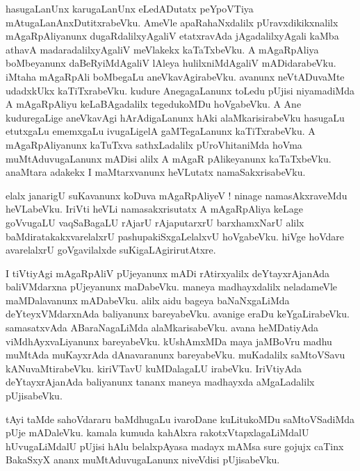 \documentclass{article}
\begin{document}
\begin{mn}%
hasugaLanUnx karugaLanUnx eLedADutatx peYpoVTiya mAtugaLanAnxDutitxrabeVku. AmeVle apaRahaNxdalilx 
pUravxdikikxnalilx mAgaRpAliyanunx dugaRdalilxyAgaliV etatxravAda jAgadalilxyAgali kaMba athavA 
madaradalilxyAgaliV meVlakekx kaTaTxbeVku. A mAgaRpAliya boMbeyanunx daBeRyiMdAgaliV lAleya 
hulilxniMdAgaliV mADidarabeVku. iMtaha mAgaRpAli boMbegaLu aneVkavAgirabeVku. avanunx 
neVtADuvaMte udadxkUkx kaTiTxrabeVku. kudure AnegagaLanunx toLedu pUjisi niyamadiMda A 
mAgaRpAliyu keLaBAgadalilx tegedukoMDu hoVgabeVku. A Ane kuduregaLige aneVkavAgi hArAdigaLanunx 
hAki alaMkarisirabeVku hasugaLu etutxgaLu ememxgaLu ivugaLigelA gaMTegaLanunx kaTiTxrabeVku. A 
mAgaRpAliyanunx kaTuTxva sathxLadalilx pUroVhitaniMda hoVma muMtAduvugaLanunx mADisi alilx A 
mAgaR pAlikeyanunx kaTaTxbeVku. anaMtara adakekx I maMtarxvanunx heVLutatx namaSakxrisabeVku.
\end{mn}

\begin{mn}%
elalx janarigU suKavanunx koDuva mAgaRpAliyeV ! ninage namasAkxraveMdu heVLabeVku. IriVti heVLi 
namasakxrisutatx A mAgaRpAliya keLage goVvugaLU vaqSaBagaLU rAjarU rAjaputarxrU barxhamxNarU 
alilx baMdiratakakxvarelalxrU pashupakiSxgaLelalxvU hoVgabeVku. hiVge hoVdare avarelalxrU 
goVgavilalxde suKigaLAgirirutAtxre.
\end{mn}

\begin{mn}%
I tiVtiyAgi mAgaRpAliV pUjeyanunx mADi rAtirxyalilx deYtayxrAjanAda baliVMdarxna pUjeyanunx 
maDabeVku. maneya madhayxdalilx neladameVle maMDalavanunx mADabeVku. alilx aidu bageya 
baNaNxgaLiMda deYteyxVMdarxnAda baliyanunx bareyabeVku. avanige eraDu keYgaLirabeVku. 
samasatxvAda ABaraNagaLiMda alaMkarisabeVku. avana heMDatiyAda viMdhAyxvaLiyanunx bareyabeVku. 
kUshAmxMDa maya jaMBoVru  madhu muMtAda muKayxrAda dAnavaranunx bareyabeVku. muKadalilx 
saMtoVSavu kANuvaMtirabeVku. kiriVTavU kuMDalagaLU irabeVku. IriVtiyAda deYtayxrAjanAda 
baliyanunx tananx maneya madhayxda aMgaLadalilx pUjisabeVku.
\end{mn}

\begin{mn}%
tAyi taMde sahoVdararu baMdhugaLu ivaroDane kuLitukoMDu saMtoVSadiMda pUje mADaleVku. kamala 
kumuda kahAlxra rakotxVtapxlagaLiMdalU hUvugaLiMdalU pUjisi hAlu belalxpAyasa madayx mAMsa sure 
gojujx caTinx BakaSxyX ananx muMtAduvugaLanunx niveVdisi pUjisabeVku.
\end{mn}
\end{document}
